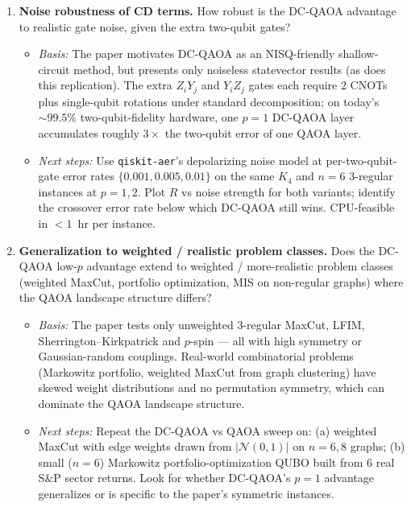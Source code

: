 \begin{enumerate}
  \item \textbf{Noise robustness of CD terms.} How robust is the DC-QAOA advantage to realistic gate noise, given the extra two-qubit gates?
  \begin{itemize}
    \item \emph{Basis:} The paper motivates DC-QAOA as an NISQ-friendly shallow-circuit method, but presents only noiseless statevector results (as does this replication). The extra $Z_iY_j$ and $Y_iZ_j$ gates each require 2 CNOTs plus single-qubit rotations under standard decomposition; on today's ${\sim}99.5\%$ two-qubit-fidelity hardware, one $p=1$ DC-QAOA layer accumulates roughly $3\times$ the two-qubit error of one QAOA layer.
    \item \emph{Next steps:} Use \texttt{qiskit-aer}'s depolarizing noise model at per-two-qubit-gate error rates $\{0.001, 0.005, 0.01\}$ on the same $K_4$ and $n=6$ 3-regular instances at $p=1,2$. Plot $R$ vs noise strength for both variants; identify the crossover error rate below which DC-QAOA still wins. CPU-feasible in $<1$~hr per instance.
  \end{itemize}

  \item \textbf{Generalization to weighted / realistic problem classes.} Does the DC-QAOA low-$p$ advantage extend to weighted / more-realistic problem classes (weighted MaxCut, portfolio optimization, MIS on non-regular graphs) where the QAOA landscape structure differs?
  \begin{itemize}
    \item \emph{Basis:} The paper tests only unweighted 3-regular MaxCut, LFIM, Sherrington--Kirkpatrick and $p$-spin --- all with high symmetry or Gaussian-random couplings. Real-world combinatorial problems (Markowitz portfolio, weighted MaxCut from graph clustering) have skewed weight distributions and no permutation symmetry, which can dominate the QAOA landscape structure.
    \item \emph{Next steps:} Repeat the DC-QAOA vs QAOA sweep on: (a) weighted MaxCut with edge weights drawn from $|\mathcal{N}(0,1)|$ on $n=6,8$ graphs; (b) small ($n=6$) Markowitz portfolio-optimization QUBO built from 6 real S\&P sector returns. Look for whether DC-QAOA's $p=1$ advantage generalizes or is specific to the paper's symmetric instances.
  \end{itemize}


\end{enumerate}
